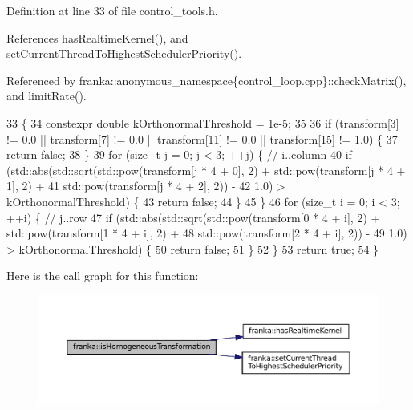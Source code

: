 Definition at line 33 of file control\+\_\+tools.\+h.



References has\+Realtime\+Kernel(), and set\+Current\+Thread\+To\+Highest\+Scheduler\+Priority().



Referenced by franka\+::anonymous\+\_\+namespace\{control\+\_\+loop.\+cpp\}\+::check\+Matrix(), and limit\+Rate().


\begin{DoxyCode}
33                                                                                         \{
34   constexpr \textcolor{keywordtype}{double} kOrthonormalThreshold = 1e-5;
35 
36   \textcolor{keywordflow}{if} (transform[3] != 0.0 || transform[7] != 0.0 || transform[11] != 0.0 || transform[15] != 1.0) \{
37     \textcolor{keywordflow}{return} \textcolor{keyword}{false};
38   \}
39   \textcolor{keywordflow}{for} (\textcolor{keywordtype}{size\_t} j = 0; j < 3; ++j) \{  \textcolor{comment}{// i..column}
40     \textcolor{keywordflow}{if} (std::abs(std::sqrt(std::pow(transform[j * 4 + 0], 2) + std::pow(transform[j * 4 + 1], 2) +
41                            std::pow(transform[j * 4 + 2], 2)) -
42                  1.0) > kOrthonormalThreshold) \{
43       \textcolor{keywordflow}{return} \textcolor{keyword}{false};
44     \}
45   \}
46   \textcolor{keywordflow}{for} (\textcolor{keywordtype}{size\_t} i = 0; i < 3; ++i) \{  \textcolor{comment}{// j..row}
47     \textcolor{keywordflow}{if} (std::abs(std::sqrt(std::pow(transform[0 * 4 + i], 2) + std::pow(transform[1 * 4 + i], 2) +
48                            std::pow(transform[2 * 4 + i], 2)) -
49                  1.0) > kOrthonormalThreshold) \{
50       \textcolor{keywordflow}{return} \textcolor{keyword}{false};
51     \}
52   \}
53   \textcolor{keywordflow}{return} \textcolor{keyword}{true};
54 \}
\end{DoxyCode}
Here is the call graph for this function\+:
\nopagebreak
\begin{figure}[H]
\begin{center}
\leavevmode
\includegraphics[width=350pt]{namespacefranka_ad81c99e8af3f2536ae3c6ec1ce8dce1e_cgraph}
\end{center}
\end{figure}
